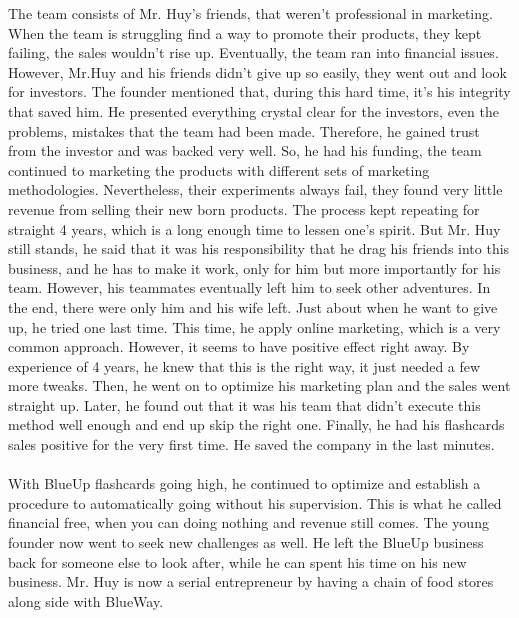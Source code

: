 \documentclass[a4paper, 11pt]{article} %
\begin{document}
The team consists of Mr. Huy's friends, that weren't professional in marketing. When the team is struggling find a way to promote their products, they kept failing, the sales wouldn't rise up. Eventually, the team ran into financial issues. However, Mr.Huy and his friends didn't give up so easily, they went out and look for investors. The founder mentioned that, during this hard time, it's his integrity that saved him. He presented everything crystal clear for the investors, even the problems, mistakes that the team had been made. Therefore, he gained trust from the investor and was backed very well. So, he had his funding, the team continued to marketing the products with different sets of marketing methodologies. Nevertheless, their experiments always fail, they found very little revenue from selling their new born products. The process kept repeating for straight 4 years, which is a long enough time to lessen one's spirit. But Mr. Huy still stands, he said that it was his responsibility that he drag his friends into this business, and he has to make it work, only for him but more importantly for his team. However, his teammates eventually left him to seek other adventures. In the end, there were only him and his wife left. Just about when he want to give up, he tried one last time. This time, he apply online marketing, which is a very common approach. However, it seems to have positive effect right away. By experience of 4 years, he knew that this is the right way, it just needed a few more tweaks. Then, he went on to optimize his marketing plan and the sales went straight up. Later, he found out that it was his team that didn't execute this method well enough and end up skip the right one. Finally, he had his flashcards sales positive for the very first time. He saved the company in the last minutes.
\\
\\
With BlueUp flashcards going high, he continued to optimize and establish a procedure to automatically going without his supervision. This is what he called financial free, when you can doing nothing and revenue still comes. The young founder now went to seek new challenges as well. He left the BlueUp business back for someone else to look after, while he can spent his time on his new business. Mr. Huy is now a serial entrepreneur by having a chain of food stores along side with BlueWay.


\end{document}

